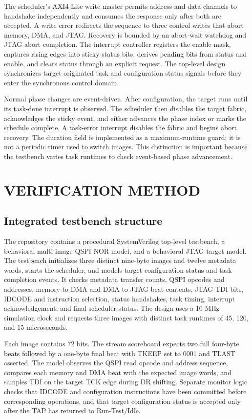 \documentclass[conference]{IEEEtran}
\begin{document}
The scheduler's AXI4-Lite write master permits address and data channels to handshake independently and consumes the response only after both are accepted. A write error redirects the sequence to three control writes that abort memory, DMA, and JTAG. Recovery is bounded by an abort-wait watchdog and JTAG abort completion. The interrupt controller registers the enable mask, captures rising edges into sticky status bits, derives pending bits from status and enable, and clears status through an explicit request. The top-level design synchronizes target-originated task and configuration status signals before they enter the synchronous control domain.

Normal phase changes are event-driven. After configuration, the target runs until its task-done interrupt is observed. The scheduler then disables the target fabric, acknowledges the sticky event, and either advances the phase index or marks the schedule complete. A task-error interrupt disables the fabric and begins abort recovery. The duration field is implemented as a maximum-runtime guard; it is not a periodic timer used to switch images. This distinction is important because the testbench varies task runtimes to check event-based phase advancement.

\section{VERIFICATION METHOD}

\subsection{Integrated testbench structure}

The repository contains a procedural SystemVerilog top-level testbench, a behavioral multi-image QSPI NOR model, and a behavioral JTAG target model. The testbench initializes three distinct nine-byte images and twelve metadata words, starts the scheduler, and models target configuration status and task-completion events. It checks metadata transfer counts, QSPI opcodes and addresses, memory-to-DMA and DMA-to-JTAG beat contents, JTAG TDI bits, IDCODE and instruction selection, status handshakes, task timing, interrupt acknowledgement, and final scheduler status. The design uses a 10 MHz simulation clock and requests three images with distinct task runtimes of 45, 120, and 15 microseconds.

Each image contains 72 bits. The stream scoreboard expects two full four-byte beats followed by a one-byte final beat with TKEEP set to 0001 and TLAST asserted. The model observes the QSPI read opcode and address sequence, compares each memory and DMA beat with the expected image words, and samples TDI on the target TCK edge during DR shifting. Separate monitor logic checks that IDCODE and configuration instructions have been committed before corresponding operations, and that target configuration status is accepted only after the TAP has returned to Run-Test/Idle.
\end{document}
